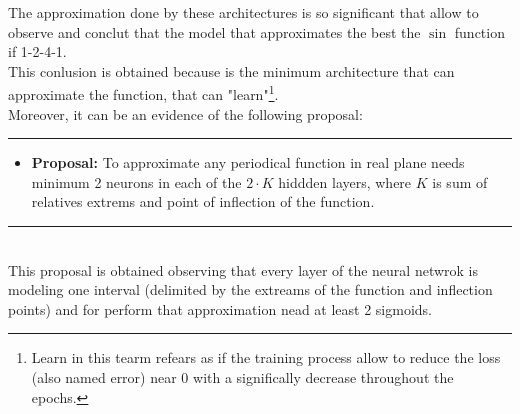 \documentclass[a4paper, 11pt]{article}
\begin{document}
The approximation done by these architectures is so significant that allow to observe and conclut that the model that approximates the best the $\sin$ function if 1-2-4-1.\\
This conlusion is obtained because is the minimum architecture that can approximate the function, that can "learn"\footnote{Learn in this tearm refears as if the training process allow to reduce the loss (also named error) near 0 with a significally decrease throughout the epochs.}.\\
Moreover, it can be an evidence of the following proposal:\\
\rule{\linewidth}{0.4pt}
\begin{itemize}
    \item \textbf{Proposal:} To approximate any periodical function in real plane needs minimum 2 neurons in each of the $2\cdot K$ hiddden layers, where $K$ is sum of relatives extrems and point of inflection of the function.
\end{itemize}
\rule{\linewidth}{0.4pt}\\ \vspace{0.5em}
This proposal is obtained observing that every layer of the neural netwrok is modeling one interval (delimited by the extreams of the function and inflection points) and for perform that approximation nead at least 2 sigmoids.
\end{document}
